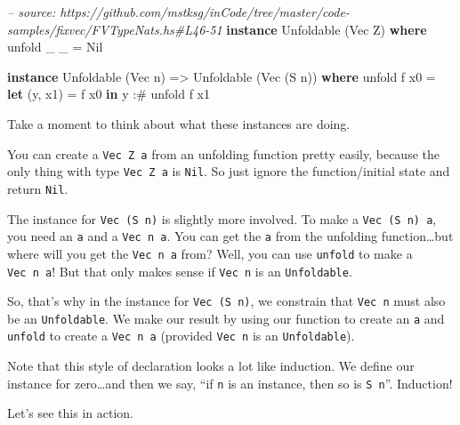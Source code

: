 \documentclass[]{article}
\newenvironment{Shaded}{\begin{snugshade}}{\end{snugshade}}
\newcommand{\CommentTok}[1]{\textcolor[rgb]{0.56,0.35,0.01}{\textit{#1}}}
\newcommand{\DataTypeTok}[1]{\textcolor[rgb]{0.13,0.29,0.53}{#1}}
\newcommand{\FunctionTok}[1]{\textcolor[rgb]{0.00,0.00,0.00}{#1}}
\newcommand{\KeywordTok}[1]{\textcolor[rgb]{0.13,0.29,0.53}{\textbf{#1}}}
\newcommand{\NormalTok}[1]{#1}
\newcommand{\OtherTok}[1]{\textcolor[rgb]{0.56,0.35,0.01}{#1}}
\begin{document}
\begin{Shaded}
\begin{Highlighting}[]
\CommentTok{-- source: https://github.com/mstksg/inCode/tree/master/code-samples/fixvec/FVTypeNats.hs#L46-51}
\KeywordTok{instance} \DataTypeTok{Unfoldable}\NormalTok{ (}\DataTypeTok{Vec} \DataTypeTok{Z}\NormalTok{) }\KeywordTok{where}
\NormalTok{    unfold _ _ }\FunctionTok{=} \DataTypeTok{Nil}

\KeywordTok{instance} \DataTypeTok{Unfoldable}\NormalTok{ (}\DataTypeTok{Vec}\NormalTok{ n) }\OtherTok{=>} \DataTypeTok{Unfoldable}\NormalTok{ (}\DataTypeTok{Vec}\NormalTok{ (}\DataTypeTok{S}\NormalTok{ n)) }\KeywordTok{where}
\NormalTok{    unfold f x0 }\FunctionTok{=} \KeywordTok{let}\NormalTok{ (y, x1) }\FunctionTok{=}\NormalTok{ f x0}
                  \KeywordTok{in}\NormalTok{  y }\FunctionTok{:#}\NormalTok{ unfold f x1}
\end{Highlighting}
\end{Shaded}

Take a moment to think about what these instances are doing.

You can create a \texttt{Vec\ Z\ a} from an unfolding function pretty easily,
because the only thing with type \texttt{Vec\ Z\ a} is \texttt{Nil}. So just
ignore the function/initial state and return \texttt{Nil}.

The instance for \texttt{Vec\ (S\ n)} is slightly more involved. To make a
\texttt{Vec\ (S\ n)\ a}, you need an \texttt{a} and a \texttt{Vec\ n\ a}. You
can get the \texttt{a} from the unfolding function\ldots{}but where will you get
the \texttt{Vec\ n\ a} from? Well, you can use \texttt{unfold} to make a
\texttt{Vec\ n\ a}! But that only makes sense if \texttt{Vec\ n} is an
\texttt{Unfoldable}.

So, that's why in the instance for \texttt{Vec\ (S\ n)}, we constrain that
\texttt{Vec\ n} must also be an \texttt{Unfoldable}. We make our result by using
our function to create an \texttt{a} and \texttt{unfold} to create a
\texttt{Vec\ n\ a} (provided \texttt{Vec\ n} is an \texttt{Unfoldable}).

Note that this style of declaration looks a lot like induction. We define our
instance for zero\ldots{}and then we say, ``if \texttt{n} is an instance, then
so is \texttt{S\ n}''. Induction!

Let's see this in action.
\end{document}
